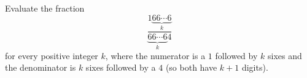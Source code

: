 Evaluate the fraction
\[\dfrac{1\underbrace{66\cdots6}_{k}}{\underbrace{66\cdots6}_{k}4}\]
for every positive integer $k$, where the numerator is a $1$ followed by $k$ sixes and the denominator is $k$ sixes followed by a $4$ (so both have $k+1$ digits).
